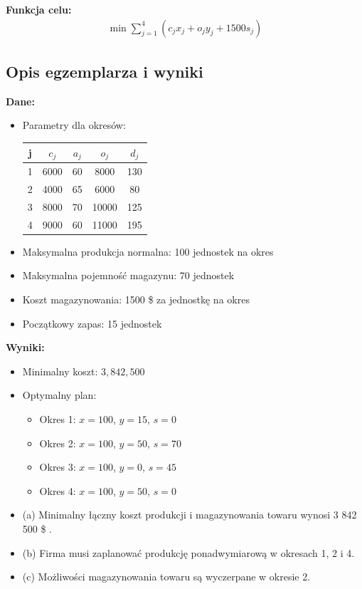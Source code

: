\documentclass[a4paper,12pt]{article}
\begin{document}
\textbf{Funkcja celu:}
\begin{align*}
\min \sum_{j=1}^{4} (c_j x_j + o_j y_j + 1500 s_j)
\end{align*}

\subsection*{Opis egzemplarza i wyniki}

\textbf{Dane:}
\begin{itemize}
\item Parametry dla okresów:
\begin{center}
\begin{tabular}{c|cccc}
j & $c_j$ & $a_j$ & $o_j$ & $d_j$ \\
\hline
1 & 6000 & 60 & 8000 & 130 \\
2 & 4000 & 65 & 6000 & 80 \\
3 & 8000 & 70 & 10000 & 125 \\
4 & 9000 & 60 & 11000 & 195 \\
\end{tabular}
\end{center}
\item Maksymalna produkcja normalna: 100 jednostek na okres
\item Maksymalna pojemność magazynu: 70 jednostek
\item Koszt magazynowania: 1500 \$ za jednostkę na okres
\item Początkowy zapas: 15 jednostek
\end{itemize}

\textbf{Wyniki:}
\begin{itemize}
\item Minimalny koszt: $3{,}842{,}500$
\item Optymalny plan:
\begin{itemize}
\item Okres 1: $x=100$, $y=15$, $s=0$
\item Okres 2: $x=100$, $y=50$, $s=70$
\item Okres 3: $x=100$, $y=0$, $s=45$
\item Okres 4: $x=100$, $y=50$, $s=0$
\end{itemize}
\item (a) Minimalny łączny koszt produkcji i magazynowania towaru wynosi 3 842 500 \$ .
\item (b) Firma musi zaplanować produkcję ponadwymiarową w okresach 1, 2 i 4.
\item (c) Możliwości magazynowania towaru są wyczerpane w okresie 2.
\end{itemize}
\end{document}
